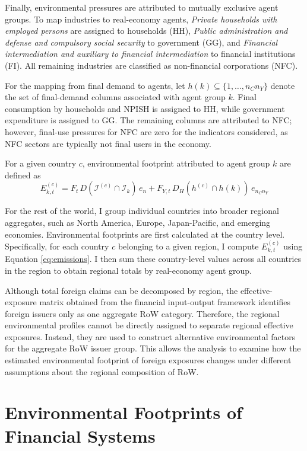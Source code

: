Finally, environmental pressures are attributed to mutually exclusive agent groups. To map industries to real-economy agents, \textit{Private households with employed persons} are assigned to households (HH), \textit{Public administration and defense and compulsory social security} to government (GG), and \textit{Financial intermediation and auxiliary to financial intermediation} to financial institutions (FI). All remaining industries are classified as non-financial corporations (NFC).  

For the mapping from final demand to agents, let $h(k) \subseteq \{1, \ldots, n_C n_Y\}$ denote the set of final-demand columns associated with agent group $k$. Final consumption by households and NPISH is assigned to HH, while government expenditure is assigned to GG. The remaining columns are attributed to NFC; however, final-use pressures for NFC are zero for the indicators considered, as NFC sectors are typically not final users in the economy.

For a given country $c$, environmental footprint attributed to agent group $k$ are defined as
\begin{equation}
E_{k,t}^{(c)} = F_t \, D(\mathcal{I}^{(c)} \cap \mathcal{I}_k)\, e_n 
+ F_{Y,t} \, D_H(h^{(c)} \cap h(k))\, e_{n_C n_Y}
\label{eq:emissions}
\end{equation}

For the rest of the world, I group individual countries into broader regional aggregates, such as North America, Europe, Japan-Pacific, and emerging economies. Environmental footprints are first calculated at the country level. Specifically, for each country $c$ belonging to a given region, I compute $E_{k,t}^{(c)}$ using Equation \ref{eq:emissions}. I then sum these country-level values across all countries in the region to obtain regional totals by real-economy agent group.

Although total foreign claims can be decomposed by region, the effective-exposure matrix obtained from the financial input-output framework identifies foreign issuers only as one aggregate RoW category. Therefore, the regional environmental profiles cannot be directly assigned to separate regional effective exposures. Instead, they are used to construct alternative environmental factors for the aggregate RoW issuer group. This allows the analysis to examine how the estimated environmental footprint of foreign exposures changes under different assumptions about the regional composition of RoW.

\section{Environmental Footprints of Financial Systems}
\label{sec:3.3}

